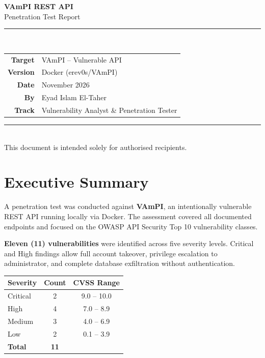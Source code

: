 \documentclass[11pt,a4paper]{article}
\begin{document}
\begin{titlepage}
  \pagecolor{accent}
  \color{white}
  \centering
  \vspace*{3cm}

  {\Huge\bfseries VAmPI REST API}\\[0.4cm]
  {\LARGE Penetration Test Report}\\[1.2cm]
  \rule{10cm}{0.4pt}\\[1.2cm]

  \begin{tabular}{rl}
    \textbf{Target}     & VAmPI -- Vulnerable API \\
    \textbf{Version}    & Docker (erev0s/VAmPI) \\
    \textbf{Date}       & November 2026 \\
    \textbf{By}         & Eyad Islam El-Taher \\
    \textbf{Track}      & Vulnerability Analyst \& Penetration Tester \\
  \end{tabular}

  \vfill
  \rule{10cm}{0.4pt}\\[0.3cm]
  {\small This document is intended solely for authorised recipients.}
\end{titlepage}
\pagecolor{white}\color{black}

\tableofcontents
\newpage

\section{Executive Summary}

A penetration test was conducted against \textbf{VAmPI}, an intentionally vulnerable REST API running locally via Docker. The assessment covered all documented endpoints and focused on the OWASP API Security Top 10 vulnerability classes.

\textbf{Eleven (11) vulnerabilities} were identified across five severity levels. Critical and High findings allow full account takeover, privilege escalation to administrator, and complete database exfiltration without authentication.

\vspace{0.5em}
\begin{center}
\begin{tabular}{lcc}
  \toprule
  \textbf{Severity} & \textbf{Count} & \textbf{CVSS Range} \\
  \midrule
  \rowcolor{critred!15} Critical & 2 & 9.0 -- 10.0 \\
  \rowcolor{highorg!15} High     & 4 & 7.0 -- 8.9  \\
  \rowcolor{medyel!15}  Medium   & 3 & 4.0 -- 6.9  \\
  \rowcolor{lowblue!15} Low      & 2 & 0.1 -- 3.9  \\
  \midrule
  \textbf{Total}   & \textbf{11} & \\
  \bottomrule
\end{tabular}
\end{center}
\end{document}
